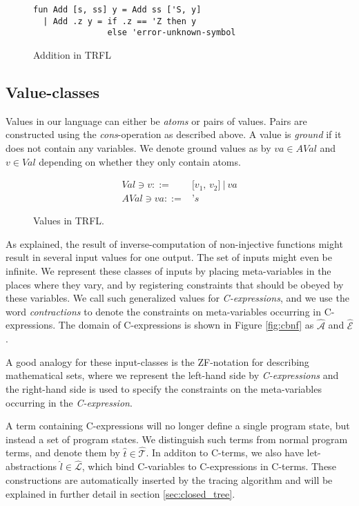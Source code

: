 \documentclass[10pt]{../sigplanconf}
\begin{document}
\begin{figure}
  \centering
\begin{verbatim}
fun Add [s, ss] y = Add ss ['S, y]
  | Add .z y = if .z == 'Z then y
               else 'error-unknown-symbol
\end{verbatim}
  \caption{Addition in TRFL}
  \label{fig:addprog}
\end{figure}


\subsection{Value-classes}
Values in our language can either be \textit{atoms} or pairs of
values. Pairs are constructed using the \textit{cons}-operation as
described above. A value is \textit{ground} if it does not contain any
variables. We denote ground values as by $va \in AVal$ and $v \in Val$
depending on whether they only contain atoms.

\begin{figure}\centering
  \begin{align*}
    Val \ni v ::= & \texttt{[$v_1$, $v_2$]}\ |\ va\\
    AVal \ni va ::= & \texttt{'}s
  \end{align*}
  \caption{Values in TRFL.}
\label{fig:vbnf}
\end{figure}

As explained, the result of inverse-computation of non-injective
functions might result in several input values for one output. The set
of inputs might even be infinite. We represent these classes of inputs
by placing meta-variables in the places where they vary, and by
registering constraints that should be obeyed by these variables.  We
call such generalized values for \textit{C-expressions}, and we use
the word \textit{contractions} to denote the constraints on
meta-variables occurring in C-expressions. The domain of C-expressions
is shown in Figure \ref{fig:cbnf} as $\mathcal{\widehat{A}}$ and
$\mathcal{\widehat{E}}$.

A good analogy for these input-classes is the ZF-notation for
describing mathematical sets, where we represent the left-hand side by
\textit{C-expressions} and the right-hand side is used to specify the
constraints on the meta-variables occurring in the
\textit{C-expression}.

A term containing C-expressions will no longer define a single program
state, but instead a set of program states. We distinguish such terms
from normal program terms, and denote them by $\widehat{t} \in
\widehat{\mathcal{T}}$. In additon to C-terms, we also have
let-abstractions $\widehat{l}\in\widehat{\mathcal{L}}$, which bind
C-variables to C-expressions in C-terms. These constructions are
automatically inserted by the tracing algorithm and will be explained
in further detail in section \ref{sec:closed_tree}.
\end{document}
